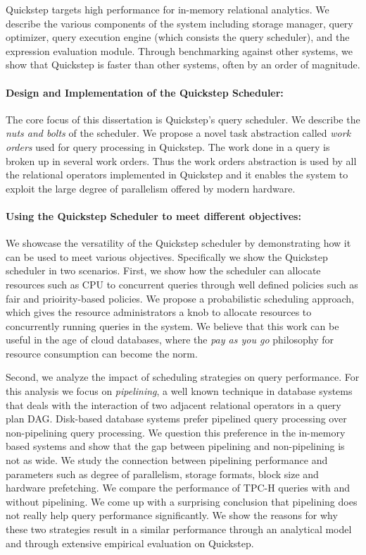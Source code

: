 Quickstep targets high performance for in-memory relational analytics. 
We describe the various components of the system including storage manager, query optimizer, query execution engine (which consists the query scheduler), and the expression evaluation module. 
Through benchmarking against other systems, we show that Quickstep is faster than other systems, often by an order of magnitude.

\paragraph{Design and Implementation of the Quickstep Scheduler:}
The core focus of this dissertation is Quickstep's query scheduler. 
We describe the \textit{nuts and bolts} of the scheduler.
We propose a novel task abstraction called \textit{work orders} used for query processing in Quickstep.
The work done in a query is broken up in several work orders.
Thus the work orders abstraction is used by all the relational operators implemented in Quickstep and it enables the system to exploit the large degree of parallelism offered by modern hardware.

\paragraph{Using the Quickstep Scheduler to meet different objectives:}
We showcase the versatility of the Quickstep scheduler by demonstrating how it can be used to meet various objectives.
Specifically we show the Quickstep scheduler in two scenarios.
First, we show how the scheduler can allocate resources such as CPU to concurrent queries through well defined policies such as fair and prioirity-based policies.
We propose a probabilistic scheduling approach, which gives the resource administrators a knob to allocate resources to concurrently running queries in the system.
We believe that this work can be useful in the age of cloud databases, where the \textit{pay as you go} philosophy for resource consumption can become the norm.

Second, we analyze the impact of scheduling strategies on query performance.
For this analysis we focus on \textit{pipelining}, a well known technique in database systems that deals with the interaction of two adjacent relational operators in a query plan DAG. 
Disk-based database systems prefer pipelined query processing over non-pipelining query processing.
We question this preference in the in-memory based systems and show that the gap between pipelining and non-pipelining is not as wide.
We study the connection between pipelining performance and parameters such as degree of parallelism, storage formats, block size and hardware prefetching.
We compare the performance of TPC-H queries with and without pipelining. 
We come up with a surprising conclusion that pipelining does not really help query performance significantly. 
We show the reasons for why these two strategies result in a similar performance through an analytical model and through extensive empirical evaluation on Quickstep.   

